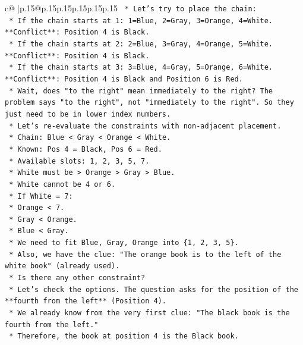 \documentclass{article}
\begin{document}
{\begin{supertabular}{c@{$\;$}|p{.15\linewidth}@{}p{.15\linewidth}p{.15\linewidth}p{.15\linewidth}p{.15\linewidth}p{.15\linewidth}}
{{{\texttt{    *   Let's try to place the chain:} \\
\texttt{        *   If the chain starts at 1: 1=Blue, 2=Gray, 3=Orange, 4=White. **Conflict**: Position 4 is Black.} \\
\texttt{        *   If the chain starts at 2: 2=Blue, 3=Gray, 4=Orange, 5=White. **Conflict**: Position 4 is Black.} \\
\texttt{        *   If the chain starts at 3: 3=Blue, 4=Gray, 5=Orange, 6=White. **Conflict**: Position 4 is Black and Position 6 is Red.} \\
\texttt{        *   Wait, does "to the right" mean immediately to the right? The problem says "to the right", not "immediately to the right". So they just need to be in lower index numbers.} \\
\texttt{        *   Let's re{-}evaluate the constraints with non{-}adjacent placement.} \\
\texttt{        *   Chain: Blue < Gray < Orange < White.} \\
\texttt{        *   Known: Pos 4 = Black, Pos 6 = Red.} \\
\texttt{        *   Available slots: 1, 2, 3, 5, 7.} \\
\texttt{        *   White must be > Orange > Gray > Blue.} \\
\texttt{        *   White cannot be 4 or 6.} \\
\texttt{        *   If White = 7:} \\
\texttt{            *   Orange < 7.} \\
\texttt{            *   Gray < Orange.} \\
\texttt{            *   Blue < Gray.} \\
\texttt{            *   We need to fit Blue, Gray, Orange into \{1, 2, 3, 5\}.} \\
\texttt{            *   Also, we have the clue: "The orange book is to the left of the white book" (already used).} \\
\texttt{            *   Is there any other constraint?} \\
\texttt{            *   Let's check the options. The question asks for the position of the **fourth from the left** (Position 4).} \\
\texttt{            *   We already know from the very first clue: "The black book is the fourth from the left."} \\
\texttt{            *   Therefore, the book at position 4 is the Black book.} \\
\\ 
}}}
\end{supertabular}}
\end{document}
